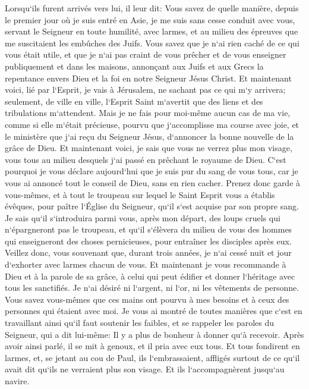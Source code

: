 \verse Lorsqu`ils furent arrivés vers lui, il leur dit: Vous savez de quelle manière, depuis le premier jour où je suis entré en Asie, je me suis sans cesse conduit avec vous, 
\verse servant le Seigneur en toute humilité, avec larmes, et au milieu des épreuves que me suscitaient les embûches des Juifs. 
\verse Vous savez que je n`ai rien caché de ce qui vous était utile, et que je n`ai pas craint de vous prêcher et de vous enseigner publiquement et dans les maisons, 
\verse annonçant aux Juifs et aux Grecs la repentance envers Dieu et la foi en notre Seigneur Jésus Christ. 
\verse Et maintenant voici, lié par l`Esprit, je vais à Jérusalem, ne sachant pas ce qui m`y arrivera; 
\verse seulement, de ville en ville, l`Esprit Saint m`avertit que des liens et des tribulations m`attendent. 
\verse Mais je ne fais pour moi-même aucun cas de ma vie, comme si elle m`était précieuse, pourvu que j`accomplisse ma course avec joie, et le ministère que j`ai reçu du Seigneur Jésus, d`annoncer la bonne nouvelle de la grâce de Dieu. 
\verse Et maintenant voici, je sais que vous ne verrez plus mon visage, vous tous au milieu desquels j`ai passé en prêchant le royaume de Dieu. 
\verse C`est pourquoi je vous déclare aujourd`hui que je suis pur du sang de vous tous, 
\verse car je vous ai annoncé tout le conseil de Dieu, sans en rien cacher. 
\verse Prenez donc garde à vous-mêmes, et à tout le troupeau sur lequel le Saint Esprit vous a établis évêques, pour paître l`Église du Seigneur, qu`il s`est acquise par son propre sang. 
\verse Je sais qu`il s`introduira parmi vous, après mon départ, des loups cruels qui n`épargneront pas le troupeau, 
\verse et qu`il s`élèvera du milieu de vous des hommes qui enseigneront des choses pernicieuses, pour entraîner les disciples après eux. 
\verse Veillez donc, vous souvenant que, durant trois années, je n`ai cessé nuit et jour d`exhorter avec larmes chacun de vous. 
\verse Et maintenant je vous recommande à Dieu et à la parole de sa grâce, à celui qui peut édifier et donner l`héritage avec tous les sanctifiés. 
\verse Je n`ai désiré ni l`argent, ni l`or, ni les vêtements de personne. 
\verse Vous savez vous-mêmes que ces mains ont pourvu à mes besoins et à ceux des personnes qui étaient avec moi. 
\verse Je vous ai montré de toutes manières que c`est en travaillant ainsi qu`il faut soutenir les faibles, et se rappeler les paroles du Seigneur, qui a dit lui-même: Il y a plus de bonheur à donner qu`à recevoir. 
\verse Après avoir ainsi parlé, il se mit à genoux, et il pria avec eux tous. 
\verse Et tous fondirent en larmes, et, se jetant au cou de Paul, 
\verse ils l`embrassaient, affligés surtout de ce qu`il avait dit qu`ils ne verraient plus son visage. Et ils l`accompagnèrent jusqu`au navire. 

